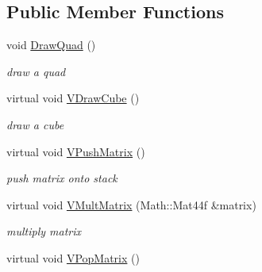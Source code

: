 \subsection*{Public Member Functions}
\begin{DoxyCompactItemize}
\item 
\hypertarget{classPlatform_1_1Renderer_1_1RendererGL_a83d7aa484a25e0626b9c244e78ec2bcf}{
void \hyperlink{classPlatform_1_1Renderer_1_1RendererGL_a83d7aa484a25e0626b9c244e78ec2bcf}{DrawQuad} ()}
\label{classPlatform_1_1Renderer_1_1RendererGL_a83d7aa484a25e0626b9c244e78ec2bcf}

\begin{DoxyCompactList}\small\item\em draw a quad \item\end{DoxyCompactList}\item 
\hypertarget{classPlatform_1_1Renderer_1_1RendererGL_a30f274b1423886864f9b26f1b0546264}{
virtual void \hyperlink{classPlatform_1_1Renderer_1_1RendererGL_a30f274b1423886864f9b26f1b0546264}{VDrawCube} ()}
\label{classPlatform_1_1Renderer_1_1RendererGL_a30f274b1423886864f9b26f1b0546264}

\begin{DoxyCompactList}\small\item\em draw a cube \item\end{DoxyCompactList}\item 
\hypertarget{classPlatform_1_1Renderer_1_1RendererGL_a24fe5bab6d8ef336a0b0411deec1769d}{
virtual void \hyperlink{classPlatform_1_1Renderer_1_1RendererGL_a24fe5bab6d8ef336a0b0411deec1769d}{VPushMatrix} ()}
\label{classPlatform_1_1Renderer_1_1RendererGL_a24fe5bab6d8ef336a0b0411deec1769d}

\begin{DoxyCompactList}\small\item\em push matrix onto stack \item\end{DoxyCompactList}\item 
\hypertarget{classPlatform_1_1Renderer_1_1RendererGL_a9177cebe1c9e988ca49b3163ba752ec0}{
virtual void \hyperlink{classPlatform_1_1Renderer_1_1RendererGL_a9177cebe1c9e988ca49b3163ba752ec0}{VMultMatrix} (Math::Mat44f \&matrix)}
\label{classPlatform_1_1Renderer_1_1RendererGL_a9177cebe1c9e988ca49b3163ba752ec0}

\begin{DoxyCompactList}\small\item\em multiply matrix \item\end{DoxyCompactList}\item 
\hypertarget{classPlatform_1_1Renderer_1_1RendererGL_a8cef9d28ea139fd3964e40f13be3b928}{
virtual void \hyperlink{classPlatform_1_1Renderer_1_1RendererGL_a8cef9d28ea139fd3964e40f13be3b928}{VPopMatrix} ()}
\label{classPlatform_1_1Renderer_1_1RendererGL_a8cef9d28ea139fd3964e40f13be3b928}


\end{DoxyCompactItemize}
